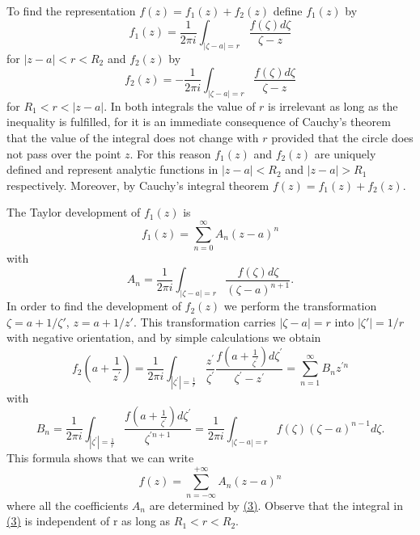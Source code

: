 To find the representation $f(z) = f_{1}(z) + f_{2}(z)$ define $f_{1}(z)$ by
\begin{equation*}
f _ {1} (z) = \frac {1}{2 \pi i} \int_ {| \zeta - a | = r} \frac {f (\zeta) d \zeta}{\zeta - z}
\end{equation*}
for $|z - a| < r < R_2$ and $f_2(z)$ by
\begin{equation*}
f _ {2} (z) = - \frac {1}{2 \pi i} \int_ {| \zeta - a | = r} \frac {f (\zeta) d \zeta}{\zeta - z}
\end{equation*}
for $R_{1} < r < |z - a|$. In both integrals the value of $r$ is irrelevant as long as the inequality is fulfilled, for it is an immediate consequence of Cauchy's theorem that the value of the integral does not change with $r$ provided that the circle does not pass over the point $z$. For this reason $f_{1}(z)$ and $f_{2}(z)$ are uniquely defined and represent analytic functions in $|z - a| < R_{2}$ and $|z - a| > R_{1}$ respectively. Moreover, by Cauchy's integral theorem $f(z) = f_{1}(z) + f_{2}(z)$.

The Taylor development of $f_{1}(z)$ is
\begin{equation*}
f _ {1} (z) = \sum_ {n = 0} ^ {\infty} A _ {n} (z - a) ^ {n}
\end{equation*}
with
\begin{equation*}
A _ {n} = \frac {1}{2 \pi i} \int_ {| \zeta - a | = r} \frac {f (\zeta) d \zeta}{(\zeta - a) ^ {n + 1}}.\tag{3}\label{eq:5.3}
\end{equation*}
In order to find the development of $f_{2}(z)$ we perform the transformation $\zeta = a + 1/\zeta'$, $z = a + 1/z'$. This transformation carries $|\zeta - a| = r$ into $|\zeta'| = 1/r$ with negative orientation, and by simple calculations we obtain
\begin{equation*}
f _ {2} \left(a + \frac {1}{z ^ {\prime}}\right) = \frac {1}{2 \pi i} \int_ {| \zeta^ {\prime} | = \frac {1}{r}} \frac {z ^ {\prime}}{\zeta^ {\prime}} \frac {f \left(a + \frac {1}{\zeta^ {\prime}}\right) d \zeta^ {\prime}}{\zeta^ {\prime} - z ^ {\prime}} = \sum_ {n = 1} ^ {\infty} B _ {n} z ^ {\prime n}
\end{equation*}
with
\begin{equation*}
B _ {n} = \frac {1}{2 \pi i} \int_ {| \zeta^ {\prime} | = \frac {1}{r}} \frac {f \left(a + \frac {1}{\zeta^ {\prime}}\right) d \zeta^ {\prime}}{\zeta^ {\prime n + 1}} = \frac {1}{2 \pi i} \int_ {| \zeta - a | = r} f (\zeta) (\zeta - a) ^ {n - 1} d \zeta .
\end{equation*}
This formula shows that we can write
\begin{equation*}
f (z) = \sum_ {n = - \infty} ^ {+ \infty} A _ {n} (z - a) ^ {n}
\end{equation*}
where all the coefficients $A_{n}$ are determined by \hyperref[eq:5.3]{(3)}. Observe that the integral in \hyperref[eq:5.3]{(3)} is independent of r as long as $R_{1} < r < R_{2}$.

